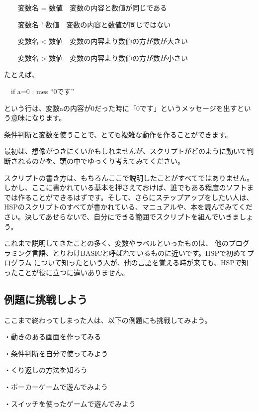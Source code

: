 \documentclass[a4paper,12pt]{jarticle}
\begin{document}
\ \ \ \ 変数名 =
数値\ \ 変数の内容と数値が同じである

\ \ \ \ 変数名 !
数値\ \ 変数の内容と数値が同じではない

\ \ \ \ 変数名 {\textless}
数値\ \ 変数の内容より数値の方が数が大きい

\ \ \ \ 変数名 {\textgreater}
数値\ \ 変数の内容より数値の方が数が小さい

\bigskip

たとえば、

\bigskip

\ \ if a=0 : mes “0です”

\bigskip

という行は、変数aの内容が0だった時に「0です」というメッセージを出すという意味になります。

条件判断と変数を使うことで、とても複雑な動作を作ることができます。

最初は、想像がつきにくいかもしれませんが、スクリプトがどのように動いて判断されるのかを、頭の中でゆっくり考えてみてください。

スクリプトの書き方は、もちろんここで説明したことがすべてではありません。しかし、ここに書かれている基本を押さえておけば、誰でもある程度のソフトまでは作ることができるはずです。そして、さらにステップアップをしたい人は、HSPのスクリプトのすべてが書かれている、マニュアルや、本を読んでみてください。決してあせらないで、自分にできる範囲でスクリプトを組んでいきましょう。

これまで説明してきたことの多く、変数やラベルといったものは、
他のプログラミング言語、とりわけBASICと呼ばれているものに近いです。HSPで初めてプログラム
について知ったという人が、他の言語を覚える時が来ても、HSPで知ったことが役に立つに違いありません。

\bigskip
\bigskip

\subsection{例題に挑戦しよう}

\bigskip
\bigskip

ここまで終わってしまった人は、以下の例題にも挑戦してみよう。

\bigskip

・動きのある画面を作ってみる

・条件判断を自分で使ってみよう

・くり返しの方法を知ろう

・ポーカーゲームで遊んでみよう

・スイッチを使ったゲームで遊んでみよう
\end{document}
